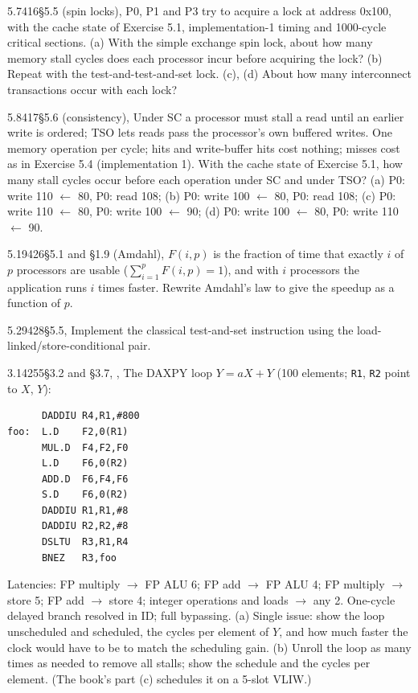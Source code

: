 \begin{tbexercise}{5.7}{416}{\S5.5 (spin locks), }
P0, P1 and P3 try to acquire a lock at address 0x100, with the cache state of
Exercise 5.1, implementation-1 timing and 1000-cycle critical sections. (a) With the
simple exchange spin lock, about how many memory stall cycles does each processor
incur before acquiring the lock? (b) Repeat with the test-and-test-and-set lock.
(c), (d) About how many interconnect transactions occur with each lock?
\end{tbexercise}

\begin{tbexercise}{5.8}{417}{\S5.6 (consistency), }
Under SC a processor must stall a read until an earlier write is ordered; TSO lets
reads pass the processor's own buffered writes. One memory operation per cycle; hits
and write-buffer hits cost nothing; misses cost as in Exercise 5.4 (implementation 1).
With the cache state of Exercise 5.1, how many stall cycles occur before each
operation under SC and under TSO? (a) P0: write 110 $\leftarrow$ 80, P0: read 108;
(b) P0: write 100 $\leftarrow$ 80, P0: read 108; (c) P0: write 110 $\leftarrow$ 80, P0:
write 100 $\leftarrow$ 90; (d) P0: write 100 $\leftarrow$ 80, P0: write 110
$\leftarrow$ 90.
\end{tbexercise}

\begin{tbexercise}{5.19}{426}{\S5.1 and \S1.9 (Amdahl), }
$F(i,p)$ is the fraction of time that exactly $i$ of $p$ processors are usable
($\sum_{i=1}^{p}F(i,p)=1$), and with $i$ processors the application runs $i$ times
faster. Rewrite Amdahl's law to give the speedup as a function of $p$.
\end{tbexercise}

\begin{tbexercise}{5.29}{428}{\S5.5, }
Implement the classical test-and-set instruction using the load-linked/store-conditional
pair.
\end{tbexercise}

\begin{tbexercise}{3.14}{255}{\S3.2 and \S3.7, ,
}
The DAXPY loop $Y=aX+Y$ (100 elements; \texttt{R1}, \texttt{R2} point to $X$, $Y$):
\begin{lstlisting}
      DADDIU R4,R1,#800
foo:  L.D    F2,0(R1)
      MUL.D  F4,F2,F0
      L.D    F6,0(R2)
      ADD.D  F6,F4,F6
      S.D    F6,0(R2)
      DADDIU R1,R1,#8
      DADDIU R2,R2,#8
      DSLTU  R3,R1,R4
      BNEZ   R3,foo
\end{lstlisting}
Latencies: FP multiply $\to$ FP ALU 6; FP add $\to$ FP ALU 4; FP multiply $\to$
store 5; FP add $\to$ store 4; integer operations and loads $\to$ any 2. One-cycle
delayed branch resolved in ID; full bypassing. (a) Single issue: show the loop
unscheduled and scheduled, the cycles per element of $Y$, and how much faster the
clock would have to be to match the scheduling gain. (b) Unroll the loop as many
times as needed to remove all stalls; show the schedule and the cycles per element.
(The book's part (c) schedules it on a 5-slot VLIW.)
\end{tbexercise}

